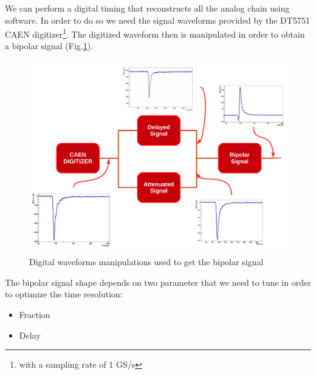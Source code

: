 \documentclass[a4paper,11pt]{article}
\begin{document}
We can perform a digital timing that reconstructs all the analog chain using software. In order to do so we need the signal waveforms provided by the DT5751 CAEN digitizer\footnote{with a sampling rate of 1 GS/s}.
The digitized waveform then is manipulated in order to obtain a bipolar signal (Fig.\ref{Fig: digital waveform manipulations}).
\begin{figure}[h!]
\centering
\includegraphics[width=\textwidth]{digital_waveform}
\caption{Digital waveforms manipulations used to get the bipolar signal}
\label{Fig: digital waveform manipulations}
\end{figure}

\noindent The bipolar signal shape depends on two parameter that we need to tune in order to optimize the time resolution:
\begin{itemize}
\item Fraction
\item Delay
\end{itemize}
\end{document}
